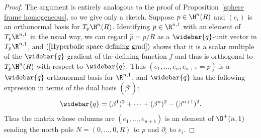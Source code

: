 \begin{proof}
The argument is entirely analogous to the proof of Proposition~\ref{sphere frame homogeneous}, so we give only a sketch. Suppose $p\in\H^n(R)$ and $(e_i)$ is an orthonormal basis for $T_p\H^n(R)$. Identifying $p\in\R^{n,1}$ with an element of $T_p\R^{n,1}$ in the usual way, we can regard $\hat{p}=p/R$ as a $\widebar{q}$-unit vector in $T_p\R^{n,1}$, and $(\ref{Hyperbolic space defining grad})$ shows that it is a scalar multiple of the $\widebar{q}$-gradient of the defining function $f$ and thus is orthogonal to $T_p\H^n(R)$ with respect to $\widebar{q}$. Thus $(e_1,\dots,e_n,e_{n+1}=\hat{p})$ is a $\widebar{q}$-orthonormal basis for $\R^{n,1}$, and $\widebar{q}$ has the following expression in terms of the dual basis $(\beta^i)$:
\[\widebar{q}=(\beta^1)^2+\cdots+(\beta^n)^2-(\beta^{n+1})^2.\]
Thus the matrix whose columns are $(e_1,\dots,e_{n+1})$ is an element of $\O^+(n,1)$ sending the north pole $N=(0,\dots,0,R)$ to $p$ and $\partial_i$ to $e_i$.
\end{proof}
